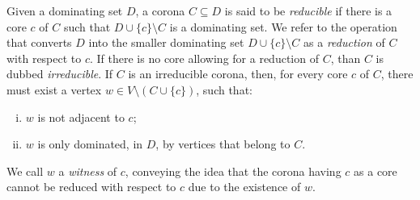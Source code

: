 \documentclass[preprint,12pt]{elsarticle}
\begin{document}
Given a dominating set $D$, a corona $C \subseteq D$ is said to be \emph{reducible} if there is a core $c$ of $C$ such that $D \cup \{c\} \setminus C$ is a dominating set. 
We refer to the operation that converts $D$ into the smaller dominating set $D \cup \{c\} \setminus C$ as a \emph{reduction} of $C$ with respect to $c$. If there is no core allowing for a reduction of $C$, than $C$ is dubbed \emph{irreducible}. 
If $C$ is an irreducible corona, then, for every core $c$ of $C$, 
there must exist a vertex $w \in V \setminus (C \cup \{c\})$, such that:
\begin{enumerate}[(i)]
\item $w$ is not adjacent to $c$;
\item $w$ is only dominated, in $D$, by vertices that belong to $C$.
\end{enumerate}
We call $w$ a \emph{witness} of $c$, conveying the idea that the corona having $c$ as a core cannot be reduced with respect to $c$ due to the existence of $w$. 
\end{document}
